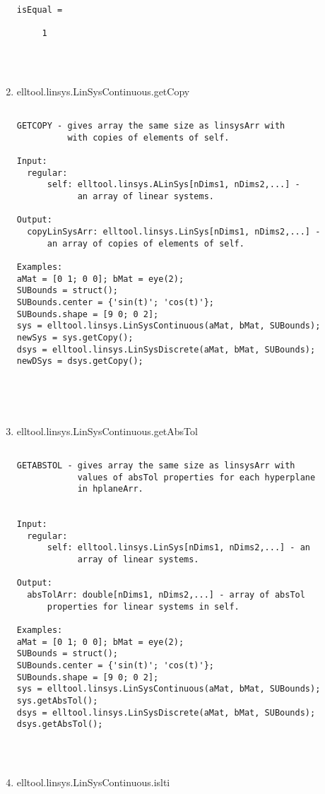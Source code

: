 \begin{enumerate}
\begin{lstlisting}
isEqual =

     1




\end{lstlisting}
\fontfamily{\familydefault}
\selectfont
\item {elltool.linsys.LinSysContinuous.getCopy}
\selectfont
\begin{lstlisting}

GETCOPY - gives array the same size as linsysArr with
          with copies of elements of self.

Input:
  regular:
      self: elltool.linsys.ALinSys[nDims1, nDims2,...] -
            an array of linear systems.

Output:
  copyLinSysArr: elltool.linsys.LinSys[nDims1, nDims2,...] -
      an array of copies of elements of self.

Examples:
aMat = [0 1; 0 0]; bMat = eye(2);
SUBounds = struct();
SUBounds.center = {'sin(t)'; 'cos(t)'};
SUBounds.shape = [9 0; 0 2];
sys = elltool.linsys.LinSysContinuous(aMat, bMat, SUBounds);
newSys = sys.getCopy();
dsys = elltool.linsys.LinSysDiscrete(aMat, bMat, SUBounds);
newDSys = dsys.getCopy();





\end{lstlisting}
\fontfamily{\familydefault}
\selectfont
\item {elltool.linsys.LinSysContinuous.getAbsTol}
\selectfont
\begin{lstlisting}

GETABSTOL - gives array the same size as linsysArr with
            values of absTol properties for each hyperplane
            in hplaneArr.


Input:
  regular:
      self: elltool.linsys.LinSys[nDims1, nDims2,...] - an
            array of linear systems.

Output:
  absTolArr: double[nDims1, nDims2,...] - array of absTol
      properties for linear systems in self.

Examples:
aMat = [0 1; 0 0]; bMat = eye(2);
SUBounds = struct();
SUBounds.center = {'sin(t)'; 'cos(t)'};
SUBounds.shape = [9 0; 0 2];
sys = elltool.linsys.LinSysContinuous(aMat, bMat, SUBounds);
sys.getAbsTol();
dsys = elltool.linsys.LinSysDiscrete(aMat, bMat, SUBounds);
dsys.getAbsTol();




\end{lstlisting}
\fontfamily{\familydefault}
\selectfont
\item {elltool.linsys.LinSysContinuous.islti}
\selectfont
\begin{lstlisting}


\end{lstlisting}
\end{enumerate}
